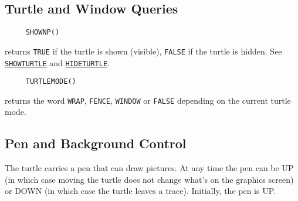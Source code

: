 

\subsection{Turtle and Window Queries}

\begin{verbatim}
     SHOWNP()
\end{verbatim}
returns \texttt{TRUE} if the turtle is shown (visible), \texttt{FALSE}
if the turtle is hidden.  See
\hyperref[logoturtle:showturtle]{\texttt{SHOWTURTLE}} and
\hyperref[logoturtle:hideturtle]{\texttt{HIDETURTLE}}.

\begin{verbatim}
     TURTLEMODE()
\end{verbatim}
returns the word \texttt{WRAP}, \texttt{FENCE}, \texttt{WINDOW} or
\texttt{FALSE} depending on the current turtle mode.



\subsection{Pen and Background Control}
\label{logoturtle:PBC}

The turtle carries a pen that can draw pictures.  At any time the pen
can be UP (in which case moving the turtle does not change what's on the
graphics screen) or DOWN (in which case the turtle leaves a trace).
Initially, the pen is UP.

